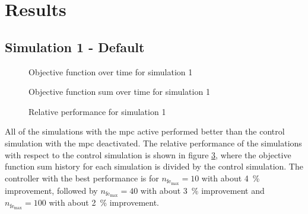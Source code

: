\documentclass[conference]{IEEEtran}
\begin{document}
\section{Results} \label{sec:results} 

 \subsection{Simulation 1 - Default}  \label{subsec:results_SS01}

\begin{figure}[h]
    \centering
    
    \caption{Objective function over time for simulation 1}
    \label{fig:SS01_obj_hist}
\end{figure}

%     

\begin{figure}[h]
    \centering
    
    \caption{Objective function sum over time for simulation 1}
    \label{fig:SS01_s_obj_hist}
\end{figure}

\begin{figure}[h]
    \centering
    
    \caption{Relative performance for simulation 1}
    \label{fig:SS01_s_obj_rel}
\end{figure}


All of the simulations with the \gls{mpc} active performed better than the control simulation with the \gls{mpc} deactivated.
The relative performance of the simulations with respect to the control simulation is shown in figure \ref{fig:SS01_s_obj_rel}, where the objective function sum history for each simulation is divided by the control simulation.
The controller with the best performance is for $n_{\text{fe}_{\text{max}}} = 10$ with about \SI{4}{\percent} improvement, followed by $n_{\text{fe}_{\text{max}}} = 40$ with about \SI{3}{\percent} improvement and $n_{\text{fe}_{\text{max}}} = 100$ with about \SI{2}{\percent} improvement.
\end{document}
